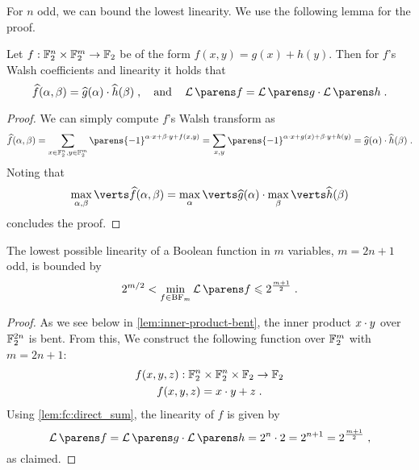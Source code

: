 For $n$ odd, we can bound the lowest linearity.
We use the following lemma for the proof.
\begin{lemma}\label{lem:fc:direct_sum}
    Let $f : \mathbb{F}_2^n \times \mathbb{F}_2^m \to \mathbb{F}_2$ be of the form $f(x, y) = g(x) + h(y)$.
    Then for $f$'s Walsh coefficients and linearity it holds that
    \begin{equation*}
        \FC{f}(\alpha, \beta) = \FC{g}(\alpha) \cdot \FC{h}(\beta)\;,
        \quad\text{and}\quad
        \linearity{f} = \linearity{g} \cdot \linearity{h}\;.
    \end{equation*}
\end{lemma}
\begin{proof}
    We can simply compute $f$'s Walsh transform as
    \begin{equation*}
          \FC{f}(\alpha,\beta)
        = \sum_{x \in \F_2^n, y \in \F_2^m} \parens{-1}^{\iprod{\alpha}{x} + \iprod{\beta}{y} + f(x,y)}
        = \sum_{x, y} \parens{-1}^{\iprod{\alpha}{x} + g(x) + \iprod{\beta}{y} + h(y) }
        = \FC{g}(\alpha) \cdot \FC{h}(\beta)\;.
    \end{equation*}
    Noting that
    \begin{equation*}
        \max_{\alpha, \beta} \abs{\FC{f}(\alpha, \beta)} = \max_\alpha \abs{\vphantom{\FC{h}}\FC{g}(\alpha)} \cdot \max_\beta \abs{\FC{h}(\beta)}
    \end{equation*}
    concludes the proof.
\end{proof}
\begin{proposition}
    The lowest possible linearity of a Boolean function in $m$ variables, $m = 2n+1$ odd, is bounded by
    \begin{equation*}
        2^{m/2} < \min_{f \in \boolfunc/_m} \linearity{f} \leqslant 2^{\frac{m+1}{2}}\;.
    \end{equation*}
\end{proposition}
\begin{proof}
    As we see below in \cref{lem:inner-product-bent}, the inner product $x \cdot y$ over $\mathbb{F}_2^{2n}$ is bent.
    From this, We construct the following function over $\mathbb{F}_2^{m}$ with $m = 2n+1$:
    \begin{gather*}
        f(x,y,z) : \mathbb{F}_2^n \times \mathbb{F}_2^n \times \mathbb{F}_2 \to \mathbb{F}_2 \\
        f(x,y,z) = x \cdot y + z\;.
    \end{gather*}
    Using \cref{lem:fc:direct_sum}, the linearity of $f$ is given by
    \begin{equation*}
        \linearity{f} = \linearity{g} \cdot \linearity{h} = 2^n \cdot 2 = 2^{n+1} = 2^{\frac{m+1}{2}}\;,
    \end{equation*}
    as claimed.
\end{proof}


